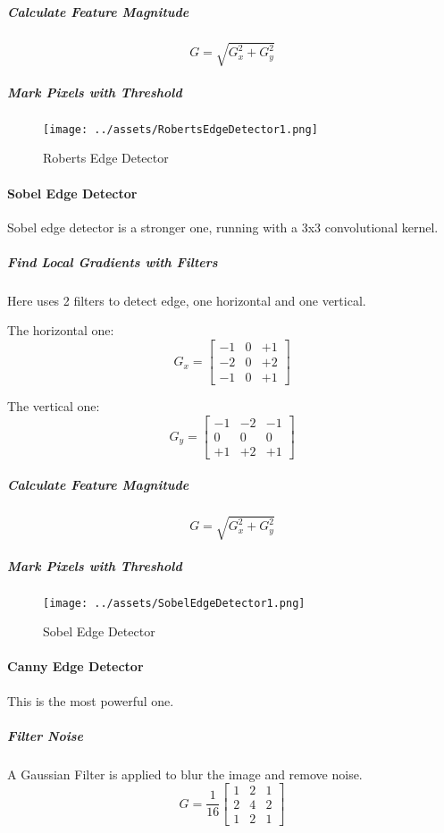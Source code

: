 \documentclass[a4paper, openany]{book}
\begin{document}
\subparagraph{Calculate Feature Magnitude}

$$G = \sqrt{G_x^2 + G_y^2}$$

\subparagraph{Mark Pixels with Threshold}

\begin{figure}[htbp]
  \centering
  \texttt{[image: ../assets/RobertsEdgeDetector1.png]}
  \caption{Roberts Edge Detector}
\end{figure}

\paragraph{Sobel Edge Detector}

Sobel edge detector is a stronger one, running with a 3x3 convolutional kernel.

\subparagraph{Find Local Gradients with Filters}

Here uses 2 filters to detect edge, one horizontal and one vertical.

The horizontal one:
$$G_x = \begin{bmatrix} -1 & 0 & +1 \\ -2 & 0 & +2 \\ -1 & 0 & +1 \end{bmatrix}$$

The vertical one:
$$G_y = \begin{bmatrix} -1 & -2 & -1 \\ 0 & 0 & 0 \\ +1 & +2 & +1 \end{bmatrix}$$

\subparagraph{Calculate Feature Magnitude}

$$G = \sqrt{G_x^2 + G_y^2}$$

\subparagraph{Mark Pixels with Threshold}

\begin{figure}[htbp]
  \centering
  \texttt{[image: ../assets/SobelEdgeDetector1.png]}
  \caption{Sobel Edge Detector}
\end{figure}

\paragraph{Canny Edge Detector}

This is the most powerful one.

\subparagraph{Filter Noise}

A Gaussian Filter is applied to blur the image and remove noise.
$$G = \frac{1}{16} \begin{bmatrix} 1 & 2 & 1 \\ 2 & 4 & 2 \\ 1 & 2 & 1 \end{bmatrix}$$
\end{document}

